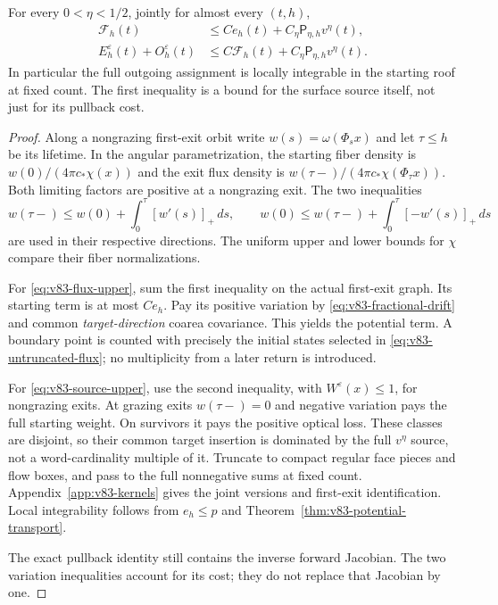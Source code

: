 \begin{theorem}
\label{thm:v83-two-sided-flux}
For every $0<\eta<1/2$, jointly for almost every $(t,h)$,
\begin{align}
 \mathcal F_h(t)&\le C e_h(t)+
                C_\eta\mathsf P_{\eta,h}v^\eta(t),
                                     \label{eq:v83-flux-upper}\\
 E_h^\varepsilon(t)+O_h^\varepsilon(t)&\le C\mathcal F_h(t)+
                C_\eta\mathsf P_{\eta,h}v^\eta(t).
                                     \label{eq:v83-source-upper}
\end{align}
In particular the full outgoing assignment is locally integrable in
the starting roof at fixed count. The first inequality is a bound
for the surface source itself, not just for its pullback cost.
\end{theorem}
\begin{proof}
Along a nongrazing first-exit orbit write $w(s)=\omega(\Phi_sx)$
and let $\tau\le h$ be its lifetime. In the angular parametrization,
the starting fiber density is $w(0)/(4\pi c_*\chi(x))$ and the
exit flux density is $w(\tau-)/(4\pi c_*\chi(\Phi_\tau x))$.
Both limiting factors are positive at a nongrazing exit. The two
inequalities
\[
 w(\tau-)\le w(0)+\int_0^\tau[w'(s)]_+\,ds,\qquad
 w(0)\le w(\tau-)+\int_0^\tau[-w'(s)]_+\,ds
\]
are used in their respective directions. The uniform upper and lower
bounds for $\chi$ compare their fiber normalizations.

For \eqref{eq:v83-flux-upper}, sum the first inequality on the actual
first-exit graph. Its starting term is at most $Ce_h$. Pay its
positive variation by \eqref{eq:v83-fractional-drift} and common
\emph{target-direction} coarea covariance. This yields the potential
term. A boundary point is counted with precisely the initial states
selected in \eqref{eq:v83-untruncated-flux}; no multiplicity from a
later return is introduced.

For \eqref{eq:v83-source-upper}, use the second inequality, with
$W^\varepsilon(x)\le1$, for nongrazing exits. At grazing exits
$w(\tau-)=0$ and negative variation pays the full starting weight.
On survivors it pays the positive optical loss. These classes are
disjoint, so their common target insertion is dominated by the full
$v^\eta$ source, not a word-cardinality multiple of it. Truncate to
compact regular face pieces and flow boxes, and pass to the full
nonnegative sums at fixed count. Appendix~\ref{app:v83-kernels}
gives the joint versions and first-exit identification. Local
integrability follows from $e_h\le p$ and
Theorem~\ref{thm:v83-potential-transport}.

The exact pullback identity still contains the inverse forward
Jacobian. The two variation inequalities account for its cost;
they do not replace that Jacobian by one.
\end{proof}

